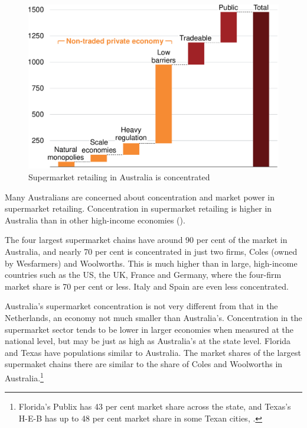 \begin{figure}
    \caption{Supermarket retailing in Australia is concentrated \label{fig:supermarkets}}
  \includegraphics[page=9]{atlas/Charts} 
\end{figure}

Many Australians are concerned about concentration and market power in supermarket retailing. Concentration in supermarket retailing is higher in Australia than in other high-income economies (). 

The four largest supermarket chains have around 90 per cent of the market in Australia, and nearly 70 per cent is concentrated in just two firms, Coles (owned by Wesfarmers) and Woolworths. This is much higher than in large, high-income countries such as the US, the UK, France and Germany, where the four-firm market share is 70 per cent or less. Italy and Spain are even less concentrated.

Australia's supermarket concentration is not very different from that in the Netherlands, an economy not much smaller than Australia's. Concentration in the supermarket sector tends to be lower in larger economies when measured at the national level, but may be just as high as Australia's at the state level. Florida and Texas have populations similar to Australia. The market shares of the largest supermaket chains there are similar to the share of Coles and Woolworths in Australia.\footnote{Florida's Publix has 43 per cent market share across the state, and Texas's H-E-B has up to 48 per cent market share in some Texan cities, \textcites{Publix-Tampa-2017}{ HEB-Statesman-2016}.}

